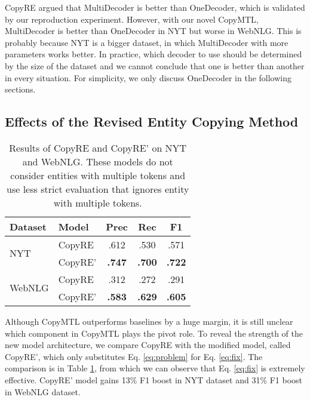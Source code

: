 \documentclass[letterpaper]{article} \usepackage{aaai20}  \usepackage{times}  \usepackage{helvet} \usepackage{courier}  \usepackage[hyphens]{url}  \usepackage{graphicx}
\begin{document}
      CopyRE argued that MultiDecoder is better than OneDecoder, which is validated by our reproduction experiment. However, with our novel CopyMTL, MultiDecoder is better than OneDecoder in NYT but worse in WebNLG. This is probably because NYT is a bigger dataset, in which MultiDecoder with more parameters works better. In practice, which decoder to use should be determined by the size of the dataset and we cannot conclude that one is better than another in every situation. For simplicity, we only discuss OneDecoder in the following sections.
  


  
  \subsection{Effects of the Revised Entity Copying Method}
  \label{sec:curve}
  
  \begin{table}[t]
  \centering
\begin{tabular}{l|l|ccc}
  \hline
  Dataset & Model & \multicolumn{1}{l}{Prec} & Rec & F1 \\ \hline
  \multirow{2}{*}{NYT} & CopyRE & .612 & .530 & .571 \\
   & CopyRE' & \textbf{.747} & \textbf{.700} & \textbf{.722} \\ \hline
  \multirow{2}{*}{WebNLG} & CopyRE & .312 & .272 & .291 \\
   & CopyRE' & \textbf{.583} & \textbf{.629} & \textbf{.605} \\ \hline
  \end{tabular}
\caption{Results of CopyRE and CopyRE' on NYT and WebNLG. These models do not consider entities with multiple tokens and use less strict evaluation that ignores entity with multiple tokens.}
  \label{tab:first_problem}
  \end{table}
      
  
      Although CopyMTL outperforms baselines by a huge margin, it is still unclear which component in CopyMTL plays the pivot role. 
      To reveal the strength of the new model architecture, we compare CopyRE with the modified model, called CopyRE', which only substitutes Eq. \eqref{eq:problem} for Eq. \eqref{eq:fix}. 
      The comparison is in Table \ref{tab:first_problem}, from which we can observe that Eq. \eqref{eq:fix} is extremely effective. 
      CopyRE' model gains 13\% F1 boost in NYT dataset and 31\% F1 boost in WebNLG dataset.
  
\end{document}
